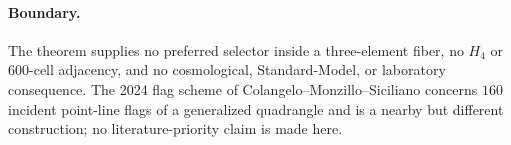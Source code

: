 \paragraph{Boundary.}
The theorem supplies no preferred selector inside a three-element fiber,
no \(H_4\) or \(600\)-cell adjacency, and no cosmological, Standard-Model,
or laboratory consequence.  The 2024 flag scheme of
Colangelo--Monzillo--Siciliano concerns \(160\) incident point-line flags
of a generalized quadrangle and is a nearby but different construction;
no literature-priority claim is made here.
